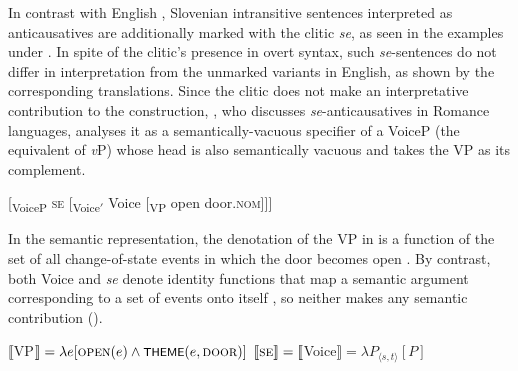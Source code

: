 \documentclass[output=paper,
modfonts,nonflat,
newtxmath
]{langsci/langscibook}
\begin{document}
\noindent In contrast with English , Slovenian intransitive sentences interpreted as anticausatives are additionally marked with the clitic \textit{se}, as seen in the examples under . In spite of the clitic’s presence in overt syntax, such \textit{se}-sentences do not differ in interpretation from the unmarked variants in English, as shown by the corresponding translations. Since the clitic does not make an interpretative contribution to the construction, \citet{schaffer2017}, who discusses \textit{se}-anticausatives in Romance languages, analyses it as a semantically-vacuous specifier of a VoiceP (the equivalent of  \textit{v}P) whose head is also semantically vacuous and takes the VP as its complement.

\begin{exe}
\ex \label{ex:lenardic: 6} {[\textsubscript{VoiceP} \textsc{se} [\textsubscript{Voice$'$} Voice [\textsubscript{VP} open door.\textsc{nom}]]]}
\end{exe} \par

\noindent In the semantic representation, the denotation of the VP in  is a function of the set of all change-of-state events in which the door becomes open . By contrast, both Voice and \textit{se} denote identity functions that map a semantic argument corresponding to a set of events onto itself , so neither makes any semantic contribution  (\citealt{schaffer2017}).

\begin{exe}
\ex \label{ex:lenardic: 7} $\llbracket$VP$\rrbracket = \lambda e[\textsc{open}(e) \wedge \cnst{theme}(e,\textsc{door})]$
\ex \label{ex:lenardic: 8} $\llbracket\textsc{se}\rrbracket = \llbracket$Voice$\rrbracket = \lambda P_{\langle s,t\rangle}[P]$
\end{exe} \par
\end{document}
